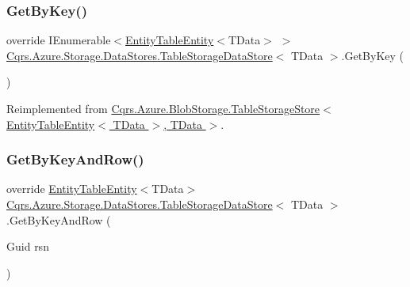 \mbox{\label{classCqrs_1_1Azure_1_1Storage_1_1DataStores_1_1TableStorageDataStore_a79043a9d497f4027cf87e5ff78fe6098}} 
\subsubsection{\texorpdfstring{Get\+By\+Key()}{GetByKey()}}
{\footnotesize\ttfamily override I\+Enumerable$<$\hyperlink{classCqrs_1_1Azure_1_1BlobStorage_1_1EntityTableEntity}{Entity\+Table\+Entity}$<$T\+Data$>$ $>$ \hyperlink{classCqrs_1_1Azure_1_1Storage_1_1DataStores_1_1TableStorageDataStore}{Cqrs.\+Azure.\+Storage.\+Data\+Stores.\+Table\+Storage\+Data\+Store}$<$ T\+Data $>$.Get\+By\+Key (\begin{DoxyParamCaption}{ }\end{DoxyParamCaption})\hspace{0.3cm}{\ttfamily [virtual]}}



Reimplemented from \hyperlink{classCqrs_1_1Azure_1_1BlobStorage_1_1TableStorageStore_a7a6e253d7d4f6d40a2b59e804f68c5c4}{Cqrs.\+Azure.\+Blob\+Storage.\+Table\+Storage\+Store$<$ Entity\+Table\+Entity$<$ T\+Data $>$, T\+Data $>$}.

\mbox{\label{classCqrs_1_1Azure_1_1Storage_1_1DataStores_1_1TableStorageDataStore_a61e3fc6404283606ec41a5e5a3c72ac8}} 
\subsubsection{\texorpdfstring{Get\+By\+Key\+And\+Row()}{GetByKeyAndRow()}}
{\footnotesize\ttfamily override \hyperlink{classCqrs_1_1Azure_1_1BlobStorage_1_1EntityTableEntity}{Entity\+Table\+Entity}$<$T\+Data$>$ \hyperlink{classCqrs_1_1Azure_1_1Storage_1_1DataStores_1_1TableStorageDataStore}{Cqrs.\+Azure.\+Storage.\+Data\+Stores.\+Table\+Storage\+Data\+Store}$<$ T\+Data $>$.Get\+By\+Key\+And\+Row (\begin{DoxyParamCaption}\item[{Guid}]{rsn }\end{DoxyParamCaption})\hspace{0.3cm}{\ttfamily [virtual]}}



